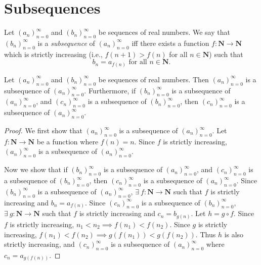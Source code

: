 \section{Subsequences}\label{sec 6.6}

\begin{definition}[Subsequences]\label{6.6.1}
    Let \((a_n)_{n = 0}^\infty\) and \((b_n)_{n = 0}^\infty\) be sequences of real numbers.
    We say that \((b_n)_{n = 0}^\infty\) is a \emph{subsequence} of \((a_n)_{n = 0}^\infty\) iff there exists a function \(f : \mathbf{N} \to \mathbf{N}\) which is strictly increasing (i.e., \(f(n + 1) > f(n)\) for all \(n \in \mathbf{N}\)) such that
    \[
        b_n = a_{f(n)} \text{ for all } n \in \mathbf{N}.
    \]
\end{definition}

\setcounter{theorem}{3}
\begin{lemma}\label{6.6.4}
    Let \((a_n)_{n = 0}^\infty\) and \((b_n)_{n = 0}^\infty\) be sequences of real numbers.
    Then \((a_n)_{n = 0}^\infty\) is a subsequence of \((a_n)_{n = 0}^\infty\).
    Furthermore, if \((b_n)_{n = 0}^\infty\) is a subsequence of \((a_n)_{n = 0}^\infty\), and \((c_n)_{n = 0}^\infty\) is a subsequence of \((b_n)_{n = 0}^\infty\), then \((c_n)_{n = 0}^\infty\) is a subsequence of \((a_n)_{n = 0}^\infty\).
\end{lemma}

\begin{proof}
    We first show that \((a_n)_{n = 0}^\infty\) is a subsequence of \((a_n)_{n = 0}^\infty\).
    Let \(f : \mathbf{N} \to \mathbf{N}\) be a function where \(f(n) = n\).
    Since \(f\) is strictly increasing, \((a_n)_{n = 0}^\infty\) is a subsequence of \((a_n)_{n = 0}^\infty\).

    Now we show that if \((b_n)_{n = 0}^\infty\) is a subsequence of \((a_n)_{n = 0}^\infty\), and \((c_n)_{n = 0}^\infty\) is a subsequence of \((b_n)_{n = 0}^\infty\), then \((c_n)_{n = 0}^\infty\) is a subsequence of \((a_n)_{n = 0}^\infty\).
    Since \((b_n)_{n = 0}^\infty\) is a subsequence of \((a_n)_{n = 0}^\infty\), \(\exists\ f : \mathbf{N} \to \mathbf{N}\) such that \(f\) is strictly increasing and \(b_n = a_{f(n)}\).
    Since \((c_n)_{n = 0}^\infty\) is a subsequence of \((b_n)_{n = 0}^\infty\), \(\exists\ g : \mathbf{N} \to \mathbf{N}\) such that \(f\) is strictly increasing and \(c_n = b_{g(n)}\).
    Let \(h = g \circ f\).
    Since \(f\) is strictly increasing, \(n_1 < n_2 \implies f(n_1) < f(n_2)\).
    Since \(g\) is strictly increasing, \(f(n_1) < f(n_2) \implies g(f(n_1)) < g(f(n_2))\).
    Thus \(h\) is also strictly increasing, and \((c_n)_{n = 0}^\infty\) is a subsequence of \((a_n)_{n = 0}^\infty\) where \(c_n = a_{g(f(n))}\).
\end{proof}

